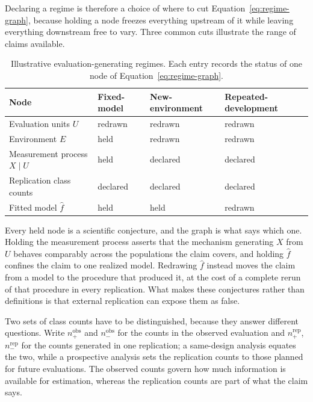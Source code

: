 \documentclass[11pt]{article}
\theoremstyle{remark}
\begin{document}
Declaring a regime is therefore a choice of where to cut Equation~\eqref{eq:regime-graph}, because holding a node freezes everything upstream of it while leaving everything downstream free to vary. Three common cuts illustrate the range of claims available.

\begin{table}[ht]
\centering
\caption{Illustrative evaluation-generating regimes. Each entry records the status of one node of Equation~\eqref{eq:regime-graph}.}
\label{tab:regimes}
\begin{tabularx}{\textwidth}{@{}>{\raggedright\arraybackslash}p{}XXX@{}}
\toprule
Node & Fixed-model & New-environment & Repeated-development \\
\midrule
Evaluation units $U$ & redrawn & redrawn & redrawn \\
Environment $E$ & held & redrawn & redrawn \\
Measurement process $X\mid U$ & held & declared & declared \\
Replication class counts & declared & declared & declared \\
Fitted model $\widehat f$ & held & held & redrawn \\
\bottomrule
\end{tabularx}
\end{table}

Every held node is a scientific conjecture, and the graph is what says which one. Holding the measurement process asserts that the mechanism generating $X$ from $U$ behaves comparably across the populations the claim covers, and holding $\widehat f$ confines the claim to one realized model. Redrawing $\widehat f$ instead moves the claim from a model to the procedure that produced it, at the cost of a complete rerun of that procedure in every replication. What makes these conjectures rather than definitions is that external replication can expose them as false.

Two sets of class counts have to be distinguished, because they answer different questions. Write $n_+^{\mathrm{obs}}$ and $n_-^{\mathrm{obs}}$ for the counts in the observed evaluation and $n_+^{\mathrm{rep}}$, $n_-^{\mathrm{rep}}$ for the counts generated in one replication; a same-design analysis equates the two, while a prospective analysis sets the replication counts to those planned for future evaluations. The observed counts govern how much information is available for estimation, whereas the replication counts are part of what the claim says.
\end{document}
